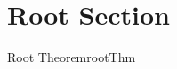 \documentclass{book}
\begin{document}
\section{Root Section}
\label{sec:root}

\begin{thm}{Root Theorem}{rootThm}
\end{thm}




\end{document}
